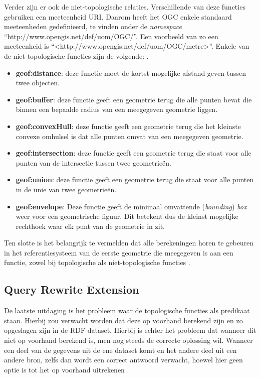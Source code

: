 Verder zijn er ook de niet-topologische relaties. Verschillende van deze functies gebruiken een meeteenheid URI. Daarom heeft het OGC enkele standaard meeteenheden gedefinieerd, te vinden onder de \textit{namespace} ``http://www.opengis.net/def/uom/OGC/''. Een voorbeeld van zo een meeteenheid is ``<http://www.opengis.net/def/uom/OGC/metre>''. Enkele van de niet-topologische functies zijn de volgende: \cite{ogcdocs}.

\begin{itemize}
    \item \textbf{geof:distance}: deze functie moet de kortst mogelijke afstand geven tussen twee objecten.
    \item \textbf{geof:buffer}: deze functie geeft een geometrie terug die alle punten bevat die binnen een bepaalde radius van een meegegeven geometrie liggen.
    \item \textbf{geof:convexHull}: deze functie geeft een geometrie terug die het kleinste convexe omhulsel is dat alle punten omvat van een meegegeven geometrie.
    \item \textbf{geof:intersection}: deze functie geeft een geometrie terug die staat voor alle punten van de intersectie tussen twee geometrieën.
    \item \textbf{geof:union}: deze functie geeft een geometrie terug die staat voor alle punten in de unie van twee geometrieën.
    \item \textbf{geof:envelope}: Deze functie geeft de minimaal omvattende (\textit{bounding}) \textit{box} weer voor een geometrische figuur. Dit betekent dus de kleinst mogelijke rechthoek waar elk punt van de geometrie in zit.
    
\end{itemize}

Ten slotte is het belangrijk te vermelden dat alle berekeningen horen te gebeuren in het referentiesysteem van de eerste geometrie die meegegeven is aan een functie, zowel bij topologische als niet-topologische functies \cite{ogcdocs}.


\subsection{Query Rewrite Extension}
\label{subsec:geosparql_rewrite_query}
De laatste uitdaging is het probleem waar de topologische functies als predikaat staan. Hierbij zou verwacht worden dat deze op voorhand berekend zijn en zo opgeslagen zijn in de RDF dataset. Hierbij is echter het probleem dat wanneer dit niet op voorhand berekend is, men nog steeds de correcte oplossing wil. Wanneer een deel van de gegevens uit de ene dataset komt en het andere deel uit een andere bron, zelfs dan wordt een correct antwoord verwacht, hoewel hier geen optie is tot het op voorhand uitrekenen \cite{ogcdocs}. 

